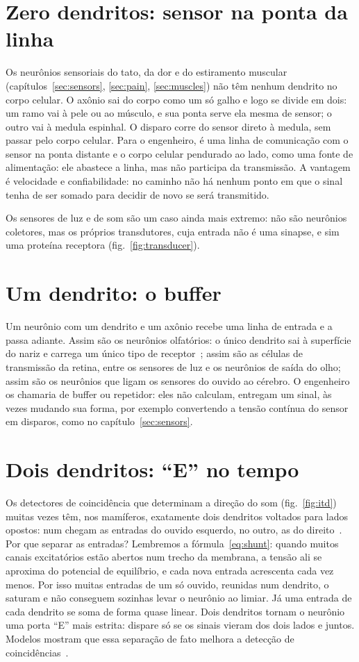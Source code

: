 \section{Zero dendritos: sensor na ponta da linha}

Os neurônios sensoriais do tato, da dor e do estiramento muscular (capítulos~\ref{sec:sensors}, \ref{sec:pain}, \ref{sec:muscles}) não têm nenhum dendrito no corpo celular. O axônio sai do corpo como um só galho e logo se divide em dois: um ramo vai à pele ou ao músculo, e sua ponta serve ela mesma de sensor; o outro vai à medula espinhal. O disparo corre do sensor direto à medula, sem passar pelo corpo celular. Para o engenheiro, é uma linha de comunicação com o sensor na ponta distante e o corpo celular pendurado ao lado, como uma fonte de alimentação: ele abastece a linha, mas não participa da transmissão. A vantagem é velocidade e confiabilidade: no caminho não há nenhum ponto em que o sinal tenha de ser somado para decidir de novo se será transmitido.

Os sensores de luz e de som são um caso ainda mais extremo: não são neurônios coletores, mas os próprios transdutores, cuja entrada não é uma sinapse, e sim uma proteína receptora (fig.~\ref{fig:transducer}).

\section{Um dendrito: o buffer}

Um neurônio com um dendrito e um axônio recebe uma linha de entrada e a passa adiante. Assim são os neurônios olfatórios: o único dendrito sai à superfície do nariz e carrega um único tipo de receptor~\cite{Mombaerts2004}; assim são as células de transmissão da retina, entre os sensores de luz e os neurônios de saída do olho; assim são os neurônios que ligam os sensores do ouvido ao cérebro. O engenheiro os chamaria de buffer ou repetidor: eles não calculam, entregam um sinal, às vezes mudando sua forma, por exemplo convertendo a tensão contínua do sensor em disparos, como no capítulo~\ref{sec:sensors}.

\section{Dois dendritos: ``E'' no tempo}

Os detectores de coincidência que determinam a direção do som (fig.~\ref{fig:itd}) muitas vezes têm, nos mamíferos, exatamente dois dendritos voltados para lados opostos: num chegam as entradas do ouvido esquerdo, no outro, as do direito~\cite{Grothe2010}. Por que separar as entradas? Lembremos a fórmula~\eqref{eq:shunt}: quando muitos canais excitatórios estão abertos num trecho da membrana, a tensão ali se aproxima do potencial de equilíbrio, e cada nova entrada acrescenta cada vez menos. Por isso muitas entradas de um só ouvido, reunidas num dendrito, o saturam e não conseguem sozinhas levar o neurônio ao limiar. Já uma entrada de cada dendrito se soma de forma quase linear. Dois dendritos tornam o neurônio uma porta ``E'' mais estrita: dispare só se os sinais vieram dos dois lados e juntos. Modelos mostram que essa separação de fato melhora a detecção de coincidências~\cite{AgmonSnir1998}.

